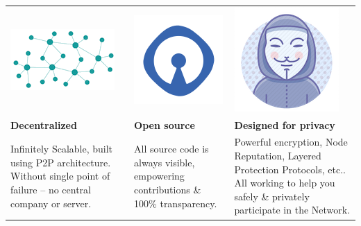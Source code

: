 \centering
\begin{adjustbox}{width=1\textwidth}
\begin{tabularx} {\textwidth}{|Y|Y|Y|}
 \hline
 \includegraphics[scale=0.3]{static/decentnew} & \includegraphics[scale=0.3]{static/opensource} & \includegraphics[scale=0.3]{static/privacy}\\ 
\textbf{Decentralized} & \textbf{Open source} & \textbf{Designed for privacy}\\
\hline
Infinitely Scalable, built using P2P architecture. Without single point of failure – no central company or server. & All source code is always visible, empowering contributions \& 100\% transparency. & Powerful encryption, Node Reputation, Layered Protection Protocols, etc.. All working to help you safely \& privately participate in the Network. \\
 \hline
\end{tabularx}
\end{adjustbox}